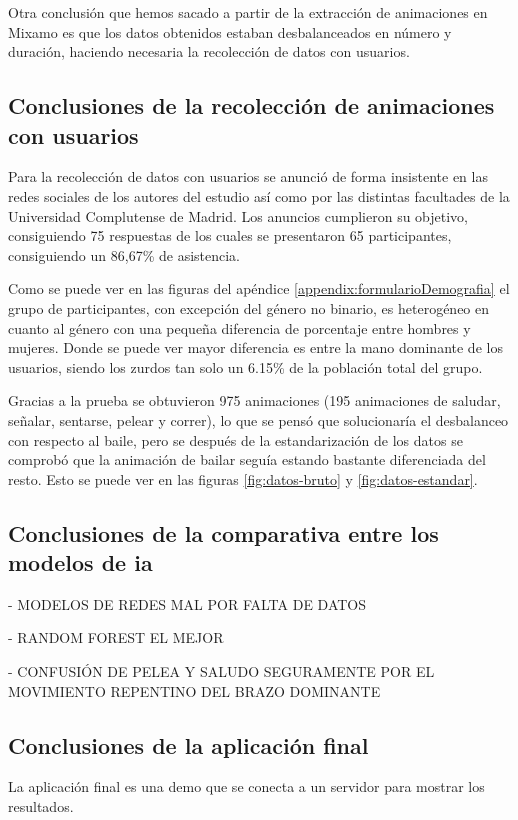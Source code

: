 Otra conclusión que hemos sacado a partir de la extracción de animaciones en Mixamo es que los datos obtenidos estaban desbalanceados en número y duración, haciendo necesaria la recolección de datos con usuarios.

\subsection{Conclusiones de la recolección de animaciones con usuarios}
Para la recolección de datos con usuarios se anunció de forma insistente en las redes sociales de los autores del estudio así como por las distintas facultades de la Universidad Complutense de Madrid.
Los anuncios cumplieron su objetivo, consiguiendo 75 respuestas de los cuales se presentaron 65 participantes, consiguiendo un 86,67\% de asistencia.

Como se puede ver en las figuras del apéndice \ref{appendix:formularioDemografia} el grupo de participantes, con excepción del género no binario, es heterogéneo en cuanto al género con una pequeña diferencia de porcentaje entre hombres y mujeres.
Donde se puede ver mayor diferencia es entre la mano dominante de los usuarios, siendo los zurdos tan solo un 6.15\% de la población total del grupo.

Gracias a la prueba se obtuvieron 975 animaciones (195 animaciones de saludar, señalar, sentarse, pelear y correr), lo que se pensó que solucionaría el desbalanceo con respecto al baile, pero se después de la estandarización de los datos se comprobó que la animación de bailar seguía estando bastante diferenciada del resto.
Esto se puede ver en las figuras \ref{fig:datos-bruto} y \ref{fig:datos-estandar}.

\subsection{Conclusiones de la comparativa entre los modelos de \gls{ia}}
- MODELOS DE REDES MAL POR FALTA DE DATOS

- RANDOM FOREST EL MEJOR

- CONFUSIÓN DE PELEA Y SALUDO SEGURAMENTE POR EL MOVIMIENTO REPENTINO DEL BRAZO DOMINANTE

\subsection{Conclusiones de la aplicación final}
La aplicación final es una demo que se conecta a un servidor para mostrar los resultados.

